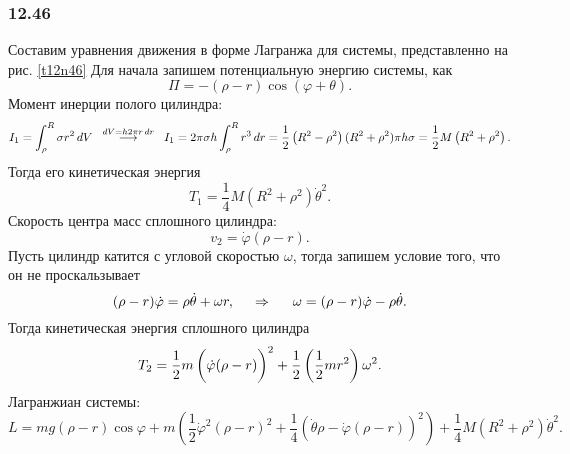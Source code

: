 \subsubsection*{12.46}

Составим уравнения движения в форме Лагранжа для системы, представленно на рис. \ref{t12n46} Для начала запишем потенциальную энергию системы, как
\begin{equation*}
    \Pi = - (\rho - r) \cos (\varphi  + \theta).
\end{equation*}
Момент инерции полого цилиндра:
\begin{equation*}
    I_1 = \int_\rho^R \sigma r^2 \, d V 
    \hspace{0.2cm} 
    \overset{dV = h 2 \pi r \, d r}{\longrightarrow} 
    \hspace{0.2cm} 
    I_1 = 2 \pi \sigma h \int_\rho^R r^3 \, d r = 
    \frac{1}{2} \left(R^2 - \rho^2  \right) (R^2 + \rho^2) \pi  h \sigma =
    \frac{1}{2} M \left(R^2 + \rho^2\right).
\end{equation*}
Тогда его кинетическая энергия 
\begin{equation*}
    T_1 = \frac{1}{4} M \left(R^2 + \rho^2\right) \dot{\theta}^2.
\end{equation*}
Скорость центра масс сплошного цилиндра:
\begin{equation*}
    v_2 = \dot{\varphi} (\rho  - r).
\end{equation*}
Пусть цилиндр катится с угловой скоростью $\omega$, тогда запишем условие того, что он не проскальзывает
\begin{equation*}
    (\rho - r) \dot{\varphi} = \rho \dot{\theta} + \omega r,
    \hspace{0.5cm} \Rightarrow \hspace{0.5cm} 
    \omega = (\rho - r) \dot{\varphi} - \rho \dot{\theta}.
\end{equation*}
Тогда кинетическая энергия сплошного цилиндра
\begin{equation*}
    T_2 = 
    \frac{1}{2} m \left(
        \dot{\varphi} (\rho - r) \vp
    \right)^2 + 
    \frac{1}{2} \left(\frac{1}{2} m r^2 \right) \omega^2
    .
\end{equation*}
Лагранжиан системы:
\begin{equation}
    L = 
    mg (\rho - r) \cos \varphi +
     m \left(
        \frac{1}{2}  \dot{\varphi}^2 (\rho - r)^2 + 
        \frac{1}{4} \left(
            \dot{\theta} \rho - \dot{\varphi} (\rho - r)
        \right)^2
    \right) + \frac{1}{4} M \left(R^2  + \rho^2\right)\dot{\theta}^2.
\end{equation}
